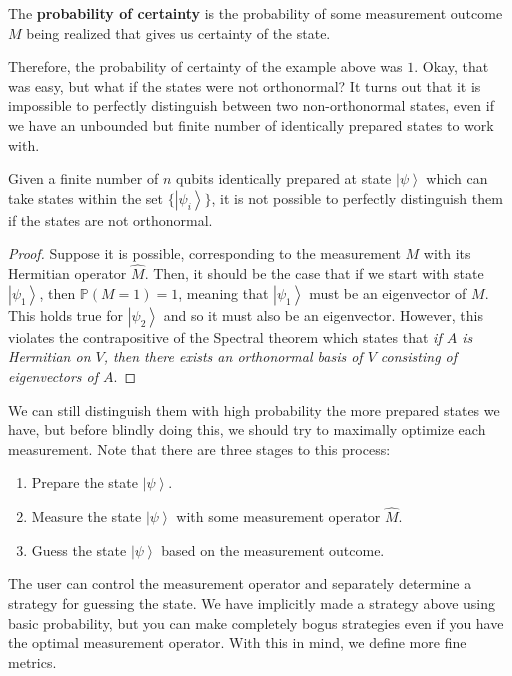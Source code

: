 \documentclass{article}
\newcommand{\ket}[1]{\ensuremath{\left|#1\right\rangle}}
\begin{document}
    \begin{definition}
      The \textbf{probability of certainty} is the probability of some measurement outcome $M$ being realized that gives us certainty of the state. 
    \end{definition}

    Therefore, the probability of certainty of the example above was $1$. Okay, that was easy, but what if the states were not orthonormal? It turns out that it is impossible to perfectly distinguish between two non-orthonormal states, even if we have an unbounded but finite number of identically prepared states to work with. 

    \begin{lemma}
      Given a finite number of $n$ qubits identically prepared at state $\ket{\psi}$ which can take states within the set $\{ \ket{\psi_i}\}$, it is not possible to perfectly distinguish them if the states are not orthonormal. 
    \end{lemma}
    \begin{proof}
      Suppose it is possible, corresponding to the measurement $M$ with its Hermitian operator $\hat{M}$. Then, it should be the case that if we start with state $\ket{\psi_1}$, then $\mathbb{P}(M = 1) = 1$, meaning that $\ket{\psi_1}$ must be an eigenvector of $M$. This holds true for $\ket{\psi_2}$ and so it must also be an eigenvector. However, this violates the contrapositive of the Spectral theorem which states that \textit{if $A$ is Hermitian on $V$, then there exists an orthonormal basis of $V$ consisting of eigenvectors of $A$}. 
    \end{proof}

    We can still distinguish them with high probability the more prepared states we have, but before blindly doing this, we should try to maximally optimize each measurement. Note that there are three stages to this process: 
    \begin{enumerate}
      \item Prepare the state $\ket{\psi}$. 
      \item Measure the state $\ket{\psi}$ with some measurement operator $\hat{M}$. 
      \item Guess the state $\ket{\psi}$ based on the measurement outcome. 
    \end{enumerate}
    The user can control the measurement operator and separately determine a strategy for guessing the state. We have implicitly made a strategy above using basic probability, but you can make completely bogus strategies even if you have the optimal measurement operator. With this in mind, we define more fine metrics. 
\end{document}
